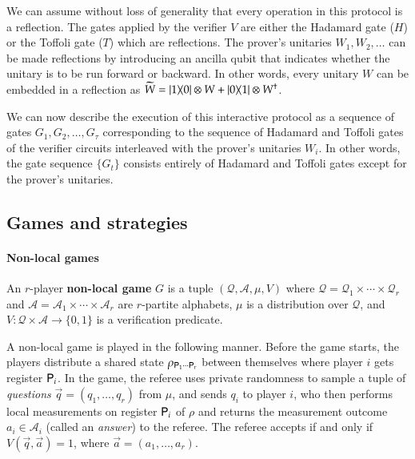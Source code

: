 We can assume without loss of generality that every operation in this protocol is a reflection. The gates applied by the verifier $V$ are either the Hadamard gate ($H$) or the Toffoli gate ($T$) which are reflections. The prover's unitaries $W_1, W_2,\ldots$ can be made reflections by introducing an ancilla qubit that indicates whether the unitary is to be run forward or backward. In other words, every unitary $W$ can be embedded in a reflection as $\widetilde{W} = |1\rangle\! \langle 0| \otimes W + |0\rangle\! \langle 1| \otimes W^\dagger$. 

We can now describe the execution of this interactive protocol as a sequence of gates $G_1,G_2,\ldots,G_\tau$ corresponding to the sequence of Hadamard and Toffoli gates of the verifier circuits interleaved with the prover's unitaries $W_i$. In other words, the gate sequence $\{G_t\}$ consists entirely of Hadamard and Toffoli gates except for the prover's unitaries. %

\subsection{Games and strategies}

\paragraph{Non-local games} An $r$-player \textbf{non-local game} $G$ is a tuple $(\mathcal{Q},\mathcal{A},\mu,V)$ where $\mathcal{Q} = \mathcal{Q}_1 \times \cdots \times \mathcal{Q}_r$ and $\mathcal{A} = \mathcal{A}_1 \times \cdots \times \mathcal{A}_r$ are $r$-partite alphabets, $\mu$ is a distribution over $\mathcal{Q}$, and $V: \mathcal{Q} \times \mathcal{A} \to \{0,1\}$ is a verification predicate. 

A non-local game is played in the following manner. Before the game starts, the players distribute a shared state $\rho_{{\mathsf{P}}_1 \cdots {\mathsf{P}}_r}$ between themselves where player $i$ gets register ${\mathsf{P}}_i$. In the game, the referee uses private randomness to sample a tuple of \emph{questions} $\vec{q} = (q_1,\ldots,q_r)$ from $\mu$, and sends $q_i$ to player $i$, who then performs local measurements on register ${\mathsf{P}}_i$ of $\rho$ and returns the measurement outcome $a_i \in \mathcal{A}_i$ (called an \emph{answer}) to the referee. The referee accepts if and only if $V(\vec{q},\vec{a}) = 1$, where $\vec{a} = (a_1,\ldots,a_r)$.



